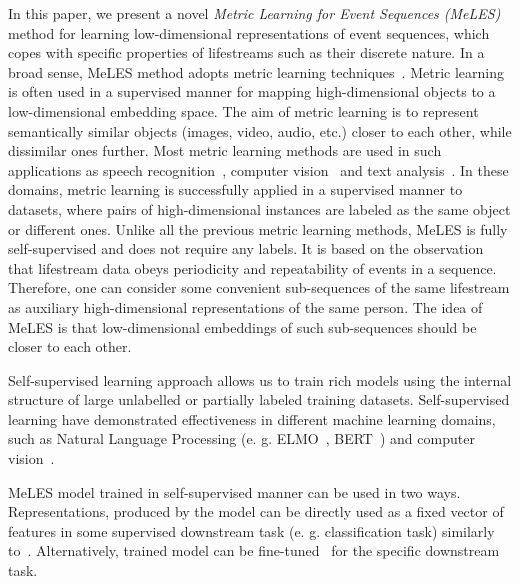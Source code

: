 \documentclass{article}
\begin{document}
In this paper, we present a novel \emph{Metric Learning for Event Sequences (MeLES)} method for learning low-dimensional representations of event sequences, which copes with specific properties of lifestreams such as their discrete nature. In a broad sense, MeLES method adopts metric learning techniques~\cite{Xing2002DistanceML, Hadsell2006DimensionalityRB}. Metric learning is often used in a supervised manner for mapping high-dimensional objects to a low-dimensional embedding space. The aim of metric learning is to represent semantically similar objects (images, video, audio, etc.) closer to each other, while dissimilar ones further. Most metric learning methods are used in such applications as speech recognition~\cite{Wan2018GeneralizedEL}, computer vision~\cite{Schroff2015FaceNetAU, Mao2019MetricLF} and text analysis~\cite{Reimers2019SentenceBERTSE}. In these domains, metric learning is successfully applied in a supervised manner to datasets, where pairs of high-dimensional instances are labeled as the same object or different ones. 
Unlike all the previous metric learning methods, MeLES is fully self-supervised and does not require any labels. It is based on the observation that lifestream data obeys periodicity and repeatability of events in a sequence. Therefore, one can consider some convenient sub-sequences of the same lifestream as auxiliary high-dimensional representations of the same person. The idea of MeLES is that low-dimensional embeddings of such sub-sequences should be closer to each other.

Self-supervised learning approach allows us to train rich models using the internal structure of large unlabelled or partially labeled training datasets. Self-supervised learning have demonstrated effectiveness in different machine learning domains, such as Natural Language Processing (e. g. ELMO~\cite{Peters2018DeepCW}, BERT~\cite{Devlin2019BERTPO}) and computer vision~\cite{Doersch2015UnsupervisedVR}. %


MeLES model trained in self-supervised manner can be used in two ways. Representations, produced by the model can be directly used as a fixed vector of features in some supervised downstream task (e. g. classification task) similarly to~\cite{Mikolov2013EfficientEO}. Alternatively, trained model can be fine-tuned~\cite{Devlin2019BERTPO} for the specific downstream task.
\end{document}
